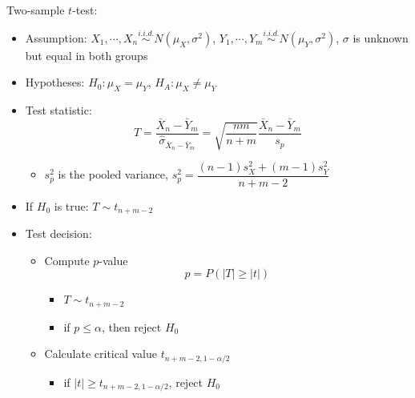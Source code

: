 \documentclass[a4paper]{article}
\begin{document}
Two-sample $t$-test:
\begin{itemize}
    \item Assumption: $X_1,\cdots,X_n\overset{i.i.d.}{\sim}N(\mu_X,\sigma^2)$, $Y_1,\cdots,Y_m\overset{i.i.d.}{\sim}N(\mu_Y,\sigma^2)$, $\sigma$ is unknown but equal in both groups
    \item Hypotheses: $H_0:\mu_X=\mu_Y$, $H_A:\mu_X\neq\mu_Y$
    \item Test statistic:
    \[T=\frac{\bar{X}_n-\bar{Y}_m }{\hat{\sigma}_{\bar{X}_n-\bar{Y}_m}}=\sqrt{\frac{nm}{n+m}}\frac{\bar{X}_n-\bar{Y}_m}{s_p} \]
    \begin{itemize}
        \item $s_p^2$ is the pooled variance, $s_p^2=\dfrac{(n-1)s_X^2+(m-1)s_Y^2}{n+m-2}$
    \end{itemize}
    \item If $H_0$ is true: $T\sim t_{n+m-2}$
    \item Test decision:
    \begin{itemize}
        \item Compute $p$-value
        \[p=P(\lvert T\rvert\geq\lvert t\rvert) \]
        \begin{itemize}
            \item $T\sim t_{n+m-2}$
            \item if $p\leq\alpha$, then reject $H_0$
        \end{itemize}
        \item Calculate critical value $t_{n+m-2,1-\alpha/2}$
        \begin{itemize}
            \item if $\lvert t\rvert\geq t_{n+m-2,1-\alpha/2}$, reject $H_0$
        \end{itemize}
    \end{itemize}
\end{itemize}
\end{document}
